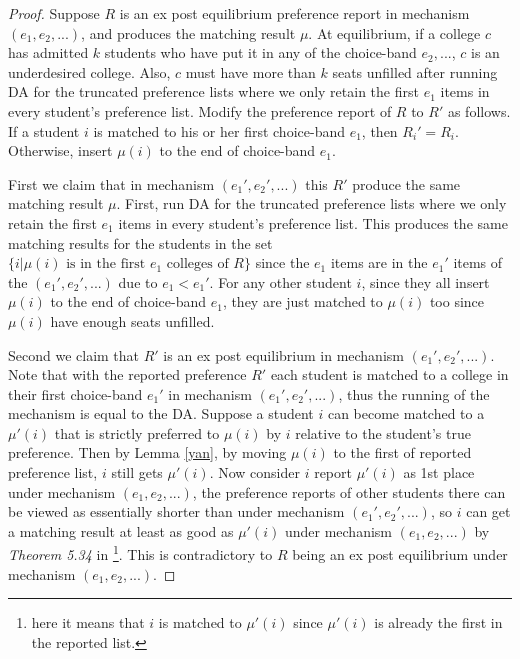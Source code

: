 \begin{proof}
  Suppose $R$ is an ex post equilibrium preference report in mechanism $(e_1,e_2,...)$, and produces the matching result $\mu$. At equilibrium, if a college $c$ has admitted $k$ students who have put it in any of the choice-band $e_2,...$, $c$ is an underdesired college. Also, $c$ must have more than $k$ seats unfilled after running  DA for the truncated preference lists where we only retain the first $e_1$ items in every student's preference list.
  Modify the preference report of $R$ to $R'$ as follows. If a student $i$ is matched to his or her first choice-band $e_1$, then $R_i'=R_i$. Otherwise, insert $\mu(i)$ to the end of choice-band $e_1$.

  First we claim that in mechanism $(e_1',e_2',...)$ this $R'$ produce the same matching result $\mu$. First, run  DA for the truncated preference lists where we only retain the first $e_1$ items in every student's preference list. This produces the same matching results for the students in the set $\{i| \mu(i) \text{ is in the first } e_1 \text{ colleges of } R\}$ since the $e_1$ items are in the $e_1'$ items of the $(e_1',e_2',...)$ due to $e_1<e_1'$. For any other student $i$, since they all insert $\mu(i)$ to the end of choice-band $e_1$, they are just matched to $\mu(i)$ too since $\mu(i)$ have enough seats unfilled. 

  Second we claim that $R'$ is an ex post equilibrium in mechanism $(e_1',e_2',...)$. Note that with the reported preference $R'$ each student is matched to a college in their first choice-band $e_1'$ in mechanism $(e_1',e_2',...)$, thus the running of the mechanism is equal to the DA. Suppose a student $i$ can become matched to a $\mu'(i)$ that is strictly preferred to $\mu(i)$ by $i$ relative to the student's true preference. Then by Lemma \ref{yan}, by moving $\mu(i)$ to the first of reported preference list, $i$ still gets $\mu'(i)$. Now consider $i$ report $\mu'(i)$ as 1st place under mechanism $(e_1,e_2,...)$, the preference reports of other students there can be viewed as essentially shorter than under mechanism $(e_1',e_2',...)$, so $i$ can get a matching result at least as good as $\mu'(i)$ under mechanism $(e_1,e_2,...)$ by \emph{Theorem 5.34} in \parencite{Roth1990}\footnote{ here it means that $i$ is matched to $\mu'(i)$ since $\mu'(i)$ is already the first in the reported list.}. This is contradictory to $R$ being an ex post equilibrium under mechanism $(e_1,e_2,...)$.


 
  
\end{proof}

